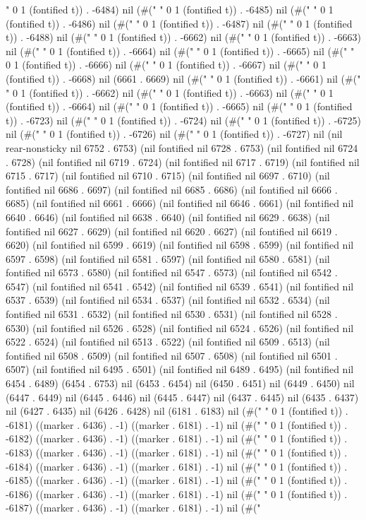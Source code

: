 " 0 1 (fontified t)) . -6484) nil (#("	" 0 1 (fontified t)) . -6485) nil (#(" " 0 1 (fontified t)) . -6486) nil (#(" " 0 1 (fontified t)) . -6487) nil (#(" " 0 1 (fontified t)) . -6488) nil (#(" " 0 1 (fontified t)) . -6662) nil (#(" " 0 1 (fontified t)) . -6663) nil (#(" " 0 1 (fontified t)) . -6664) nil (#(" " 0 1 (fontified t)) . -6665) nil (#(" " 0 1 (fontified t)) . -6666) nil (#(" " 0 1 (fontified t)) . -6667) nil (#(" " 0 1 (fontified t)) . -6668) nil (6661 . 6669) nil (#("
" 0 1 (fontified t)) . -6661) nil (#("	" 0 1 (fontified t)) . -6662) nil (#(" " 0 1 (fontified t)) . -6663) nil (#(" " 0 1 (fontified t)) . -6664) nil (#(" " 0 1 (fontified t)) . -6665) nil (#("
" 0 1 (fontified t)) . -6723) nil (#("	" 0 1 (fontified t)) . -6724) nil (#(" " 0 1 (fontified t)) . -6725) nil (#(" " 0 1 (fontified t)) . -6726) nil (#(" " 0 1 (fontified t)) . -6727) nil (nil rear-nonsticky nil 6752 . 6753) (nil fontified nil 6728 . 6753) (nil fontified nil 6724 . 6728) (nil fontified nil 6719 . 6724) (nil fontified nil 6717 . 6719) (nil fontified nil 6715 . 6717) (nil fontified nil 6710 . 6715) (nil fontified nil 6697 . 6710) (nil fontified nil 6686 . 6697) (nil fontified nil 6685 . 6686) (nil fontified nil 6666 . 6685) (nil fontified nil 6661 . 6666) (nil fontified nil 6646 . 6661) (nil fontified nil 6640 . 6646) (nil fontified nil 6638 . 6640) (nil fontified nil 6629 . 6638) (nil fontified nil 6627 . 6629) (nil fontified nil 6620 . 6627) (nil fontified nil 6619 . 6620) (nil fontified nil 6599 . 6619) (nil fontified nil 6598 . 6599) (nil fontified nil 6597 . 6598) (nil fontified nil 6581 . 6597) (nil fontified nil 6580 . 6581) (nil fontified nil 6573 . 6580) (nil fontified nil 6547 . 6573) (nil fontified nil 6542 . 6547) (nil fontified nil 6541 . 6542) (nil fontified nil 6539 . 6541) (nil fontified nil 6537 . 6539) (nil fontified nil 6534 . 6537) (nil fontified nil 6532 . 6534) (nil fontified nil 6531 . 6532) (nil fontified nil 6530 . 6531) (nil fontified nil 6528 . 6530) (nil fontified nil 6526 . 6528) (nil fontified nil 6524 . 6526) (nil fontified nil 6522 . 6524) (nil fontified nil 6513 . 6522) (nil fontified nil 6509 . 6513) (nil fontified nil 6508 . 6509) (nil fontified nil 6507 . 6508) (nil fontified nil 6501 . 6507) (nil fontified nil 6495 . 6501) (nil fontified nil 6489 . 6495) (nil fontified nil 6454 . 6489) (6454 . 6753) nil (6453 . 6454) nil (6450 . 6451) nil (6449 . 6450) nil (6447 . 6449) nil (6445 . 6446) nil (6445 . 6447) nil (6437 . 6445) nil (6435 . 6437) nil (6427 . 6435) nil (6426 . 6428) nil (6181 . 6183) nil (#(" " 0 1 (fontified t)) . -6181) ((marker . 6436) . -1) ((marker . 6181) . -1) nil (#(" " 0 1 (fontified t)) . -6182) ((marker . 6436) . -1) ((marker . 6181) . -1) nil (#(" " 0 1 (fontified t)) . -6183) ((marker . 6436) . -1) ((marker . 6181) . -1) nil (#(" " 0 1 (fontified t)) . -6184) ((marker . 6436) . -1) ((marker . 6181) . -1) nil (#(" " 0 1 (fontified t)) . -6185) ((marker . 6436) . -1) ((marker . 6181) . -1) nil (#(" " 0 1 (fontified t)) . -6186) ((marker . 6436) . -1) ((marker . 6181) . -1) nil (#(" " 0 1 (fontified t)) . -6187) ((marker . 6436) . -1) ((marker . 6181) . -1) nil (#("
